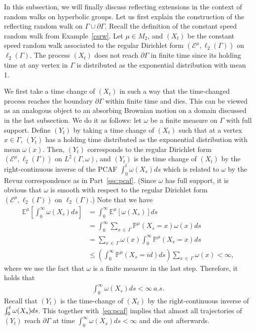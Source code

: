\documentclass[AHL,Unicode,longabstracts,published]{cedram}
\newcommand{\ce}{\mathcal{E}}
\newcommand{\bp}{\mathbb{P}}
\newcommand{\be}{\mathbb{E}}
\begin{document}
In this subsection, we will finally discuss reflecting extensions in the context of random walks on hyperbolic groups. Let us first explain the construction of the reflecting random walk on $\Gamma\cup\partial\Gamma$. Recall the definition of the constant speed random walk from Example~\ref{csrw}. Let $\mu\in M_2$, and $(X_t)$ be the constant speed random walk associated to the regular Dirichlet form $(\ce^{\mu},\ell_2(\Gamma))$ on $\ell_2(\Gamma)$. The process $(X_t)$ does not reach $\partial\Gamma$ in finite time since its holding time at any vertex in $\Gamma$ is distributed as the exponential distribution with mean 1.

We first take a time change of $(X_t)$ in such a way that the time-changed process reaches the boundary $\partial\Gamma$ within finite time and dies. This can be viewed as an analogous object to an absorbing Brownian motion on a domain discussed in the last subsection. We do it as follows: let $\omega$ be a finite measure on $\Gamma$ with full support. Define $(Y_t)$ by taking a time change of $(X_t)$ such that at a vertex $x\in\Gamma$, $(Y_t)$ has a holding time distributed as the exponential distribution with mean $\omega(x)$. Then, $(Y_t)$ corresponds to the regular Dirichlet form $(\ce^{\mu},\ell_2(\Gamma))$ on $L^2(\Gamma,\omega)$, and $(Y_t)$ is the time change of $(X_t)$ by the right-continuous inverse of the PCAF $\int_0^t\omega(X_s)ds$ which is related to $\omega$ by the Revuz correspondence as in Part~\ref{ssc:pcaf}. (Since $\omega$ has full support, it is obvious that $\omega$ is smooth with respect to the regular Dirichlet form $(\ce^{\mu},\ell_2(\Gamma))$ on $\ell_2(\Gamma)$.) Note that we have
\begin{align*}
\be^{\mu}\left[\int_0^{\infty}\omega(X_s)ds\right]&=\int_0^{\infty}\be^{\mu}\left[\omega(X_s)\right]ds\\
&=\int_0^{\infty}\sum_{x\,\in\,\Gamma}\bp^{\mu}(X_s=x)\omega(x)ds\\
&=\sum_{x\,\in\,\Gamma}\omega(x)\int_0^{\infty}\bp^{\mu}(X_s=x)ds\\
&\leq \left(\int_0^{\infty}\bp^{\mu}(X_s=id)ds\right)\sum_{x\,\in\,\Gamma}\omega(x)<\infty,
\end{align*}
where we use the fact that $\omega$ is a finite measure in the last step. Therefore, it holds that
\begin{align}\label{eq:pcaf}
\int_0^{\infty}\omega(X_s)ds<\infty\ a.s.
\end{align}
Recall that $(Y_t)$ is the time-change of $(X_t)$ by the right-continuous inverse of $\int_0^t\omega(X_s)\linebreak ds$. This together with~\eqref{eq:pcaf} implies that almost all trajectories of $(Y_t)$ reach $\partial\Gamma$ at time $\int_0^{\infty}\omega(X_s)ds<\infty$ and die out afterwards.
\end{document}
